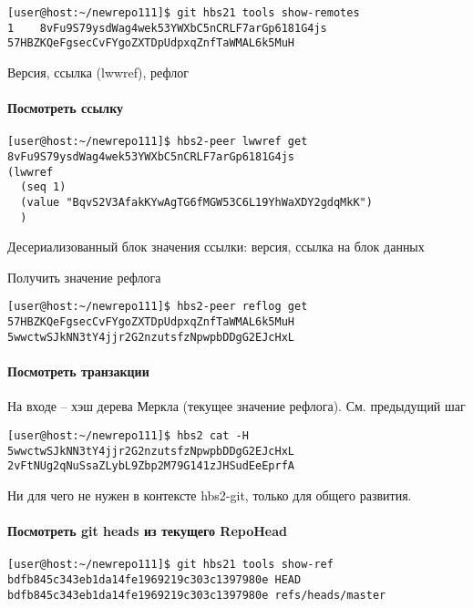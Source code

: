 \documentclass[11pt,a4paper]{article}
\begin{document}
\begin{verbatim}
[user@host:~/newrepo111]$ git hbs21 tools show-remotes
1    8vFu9S79ysdWag4wek53YWXbC5nCRLF7arGp6181G4js 57HBZKQeFgsecCvFYgoZXTDpUdpxqZnfTaWMAL6k5MuH
\end{verbatim}

Версия, ссылка (lwwref), рефлог

\paragraph{Посмотреть ссылку}

\begin{verbatim}
[user@host:~/newrepo111]$ hbs2-peer lwwref get 8vFu9S79ysdWag4wek53YWXbC5nCRLF7arGp6181G4js
(lwwref
  (seq 1)
  (value "BqvS2V3AfakKYwAgTG6fMGW53C6L19YhWaXDY2gdqMkK")
  )
\end{verbatim}

Десериализованный блок значения ссылки: версия, ссылка на блок данных

Получить значение рефлога
\begin{verbatim}
[user@host:~/newrepo111]$ hbs2-peer reflog get 57HBZKQeFgsecCvFYgoZXTDpUdpxqZnfTaWMAL6k5MuH
5wwctwSJkNN3tY4jjr2G2nzutsfzNpwpbDDgG2EJcHxL
\end{verbatim}

\paragraph{Посмотреть транзакции}

На входе -- хэш дерева Меркла (текущее значение рефлога). См. предыдущий шаг

\begin{verbatim}
[user@host:~/newrepo111]$ hbs2 cat -H 5wwctwSJkNN3tY4jjr2G2nzutsfzNpwpbDDgG2EJcHxL
2vFtNUg2qNuSsaZLybL9Zbp2M79G141zJHSudEeEprfA
\end{verbatim}

Ни для чего не нужен в контексте hbs2-git, только для общего развития.

\paragraph{Посмотреть git heads из текущего RepoHead}

\begin{verbatim}
[user@host:~/newrepo111]$ git hbs21 tools show-ref
bdfb845c343eb1da14fe1969219c303c1397980e HEAD
bdfb845c343eb1da14fe1969219c303c1397980e refs/heads/master
\end{verbatim}
\end{document}
